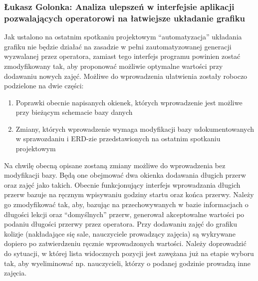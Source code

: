 \documentclass[12pt,a4paper,oneside]{article}
\theoremstyle{definition}
\numberwithin{equation}{section}
\begin{document}
\subsubsection{Łukasz Golonka: Analiza ulepszeń w interfejsie aplikacji pozwalających operatorowi na łatwiejsze układanie grafiku} \label{interface_improvements}
Jak ustalono na ostatnim spotkaniu projektowym ``automatyzacja'' układania grafiku nie będzie działać na zasadzie w pełni zautomatyzowanej generacji wyzwalanej przez operatora, zamiast tego interfejs programu powinien zostać zmodyfikowany tak, aby proponować możliwie optymalne wartości przy dodawaniu nowych zajęć. Możliwe do wprowadzenia ułatwienia zostały roboczo podzielone na dwie części:
\begin{enumerate}
	\item Poprawki obecnie napisanych okienek, których wprowadzenie jest możliwe przy bieżącym schemacie bazy danych
	\item Zmiany, których wprowadzenie wymaga modyfikacji bazy udokumentowanych w sprawozdaniu i ERD-zie przedstawionych na ostatnim spotkaniu projektowym
\end{enumerate}
Na chwilę obecną opisane zostaną zmiany możliwe do wprowadzenia bez modyfikacji bazy.
Będą one obejmować dwa okienka dodawania długich przerw oraz zajęć jako takich.
Obecnie funkcjonujący interfejs wprowadzania długich przerw bazuje na ręcznym wpisywaniu godziny startu oraz końca przerwy.
Należy go zmodyfikować tak, aby, bazując na przechowywanych w bazie informacjach o długości lekcji oraz ``domyślnych'' przerw, generował akceptowalne wartości po podaniu długości przerwy przez operatora.
Przy dodawaniu zajęć do grafiku kolizje (nakładające się sale, nauczyciele prowadzący zajęcia) są wykrywane dopiero po zatwierdzeniu ręcznie wprowadzonych wartości.
Należy doprowadzić do sytuacji, w której lista widocznych pozycji jest zawężana już na etapie wyboru tak, aby wyeliminować np. nauczycieli, którzy o podanej godzinie prowadzą inne zajęcia.
\end{document}
